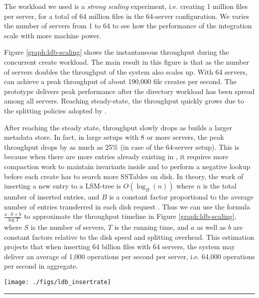The workload we used is a \textit{strong scaling} experiment, i.e.
creating 1 million files per server, for a total of 64 million files in the
64-server configuration. We varies the number of servers from 1 to 64
to see how the performance of the integration scale with more machine power.

Figure \ref{graph:ldb-scaling} shows the instantaneous throughput
during the concurrent create workload.
The main result in this figure is that as the number of servers doubles the
throughput of the system also scales up. With 64 servers, \giga can achieve a
peak throughput of about 190,000 file creates per second.
The prototype delivers peak performance after the directory workload
has been spread among all servers.
Reaching steady-state, the throughput quickly grows
due to the splitting policies adopted by \giga.

After reaching the steady state, throughput slowly drops
as \tfs builds a larger metadata store.
In fact, in large setups with 8 or more servers,
the peak throughput drops by as much as 25\% (in case of the 64-server setup).
This is because when there are more entries already existing in \tfs,
it requires more compaction work to maintain invariants inside \ldb
and to perform a negative lookup before each create
has to search more SSTables on disk.
In theory, the work of inserting a new entry to a LSM-tree is $O(\log_{B}(n))$
where $n$ is the total number of inserted entries, and $B$ is a constant factor
proportional to the average number of entries transferred in each disk request
\cite{Bender2007}.
Thus we can use the formula $\frac{a\cdot S+b}{\log{T}}$ to
approximate the throughput timeline in Figure \ref{graph:ldb-scaling},
where $S$ is the number of servers, $T$ is the running time,
and $a$ as well as $b$ are constant factors
relative to the disk speed and splitting overhead.
This estimation projects that when inserting 64 billion files with 64 servers,
the system may deliver an average of 1,000 operations per second per server,
i.e. 64,000 operations per second in aggregate.

\begin{figure*}[t]
\centerline{\texttt{[image: ./figs/ldb\_insertrate]}}
\vspace{10pt}
\caption{\normalsize
\textit{Our middleware metadata service prototype shows promising scalability
up to 64 servers.
Note that at the end of the experiment,
the throughput drops to zero
because clients stop creating files as they finish 1 million files per client.
And the solid lines in each configuration are Bezier
curves to smooth the variability.}
}
\vspace{10pt}
\hrule
\label{graph:ldb-scaling}
\end{figure*}


